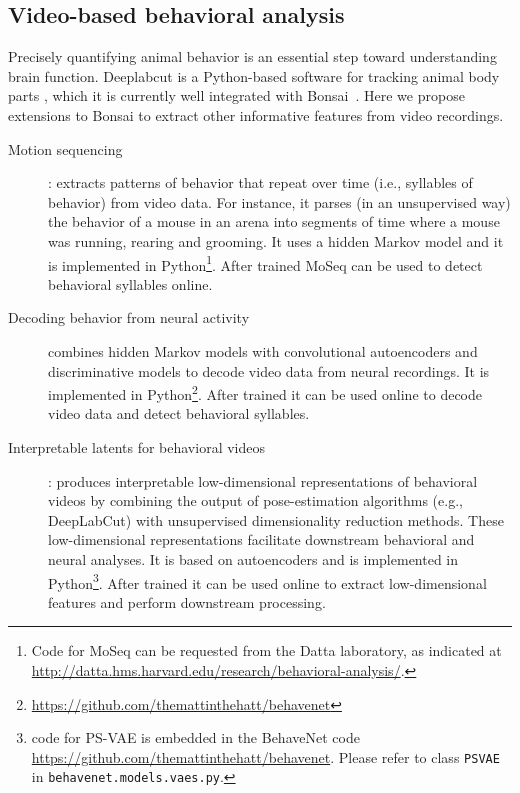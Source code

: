 \documentclass[a4paper,11point]{article}
\begin{document}
\subsection{Video-based behavioral analysis}
\label{sec:videoBasedBehavioralAnalysis}

Precisely quantifying animal behavior is an essential step toward understanding
brain function.  Deeplabcut is a Python-based software for tracking animal body
parts \citep{mathisEtAl18}, which it is currently well integrated with
Bonsai~\citep{kaneEtAl20}. Here we propose extensions to Bonsai to extract
other informative features from video recordings.

\begin{description}

    \item[Motion sequencing]\citep[MoSeq;][]{wiltschkoEtAl15}: extracts patterns
        of behavior that repeat over time (i.e., syllables of behavior) from
        video data. For instance, it parses (in an unsupervised way) the
        behavior of a mouse in an arena into segments of time where a mouse
        was running, rearing and grooming. It uses a hidden Markov model and it
        is implemented in Python\footnote{Code for MoSeq can be requested from
        the Datta laboratory, as indicated at
        \href{http://datta.hms.harvard.edu/research/behavioral-analysis/}{http://datta.hms.harvard.edu/research/behavioral-analysis/}.}.
        After trained MoSeq can be used to detect behavioral syllables online.

    \item[Decoding behavior from neural
        activity]\citep[BehaveNet;][]{battyEtAl19} combines hidden Markov
        models with convolutional autoencoders and discriminative models to
        decode video data from neural recordings. It is implemented in
        Python\footnote{\href{https://github.com/themattinthehatt/behavenet}{https://github.com/themattinthehatt/behavenet}}.
        After trained it can be used online to decode video data and detect
        behavioral syllables.

    \item[Interpretable latents for behavioral videos]\citep[Partitioned
        Subspace Variational Autoencoder, PS-VAE;][]{whitewayEtAl21}: produces
        interpretable low-dimensional representations of behavioral videos by
        combining the output of pose-estimation algorithms (e.g., DeepLabCut)
        with unsupervised dimensionality reduction methods. These
        low-dimensional representations facilitate downstream behavioral and
        neural analyses. It is based on autoencoders and is implemented in
        Python\footnote{code for PS-VAE is embedded in the BehaveNet code
        \href{https://github.com/themattinthehatt/behavenet}{https://github.com/themattinthehatt/behavenet}.
        Please refer to class \texttt{PSVAE} in 
        \texttt{behavenet.models.vaes.py}.}. After trained it can be used
        online to extract low-dimensional features and perform downstream
        processing.

\end{description}
\end{document}

